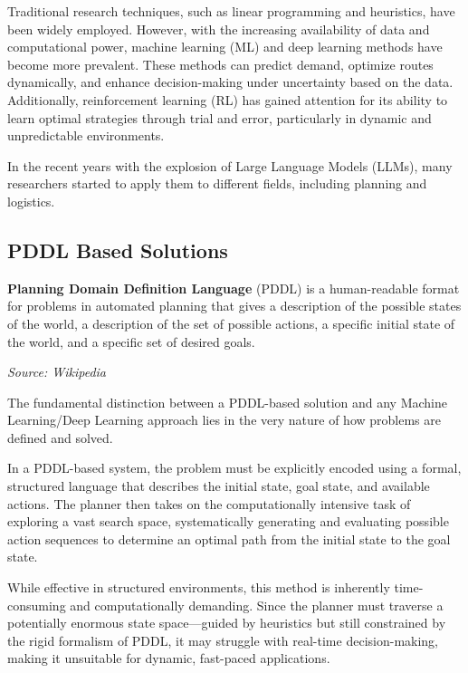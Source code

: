 Traditional research techniques, such as linear programming and heuristics, have
been widely employed. However, with the increasing availability of data and
computational power, machine learning (ML) and deep learning methods have become
more prevalent. These methods can predict demand, optimize routes dynamically,
and enhance decision-making under uncertainty based on the data. Additionally,
reinforcement learning (RL) has gained attention for its ability to learn
optimal strategies through trial and error, particularly in dynamic and unpredictable
environments.

In the recent years with the explosion of Large Language Models (LLMs), many
researchers started to apply them to different fields, including planning and logistics.


\subsection{PDDL Based Solutions}
\begin{blockquote}
  \textbf{Planning Domain Definition Language} (PDDL) is a human-readable format
  for problems in automated planning that gives a description of the possible
  states of the world, a description of the set of possible actions, a specific
  initial state of the world, and a specific set of desired goals.

  \emph{Source: Wikipedia\footnotemark}
\end{blockquote}

The fundamental distinction between a PDDL-based solution and any Machine Learning/Deep
Learning approach lies in the very nature of how problems are defined and solved.

In a PDDL-based system, the problem must be explicitly encoded using a formal, structured
language that describes the initial state, goal state, and available actions.
The planner then takes on the computationally intensive task of exploring a vast
search space, systematically generating and evaluating possible action sequences
to determine an optimal path from the initial state to the goal state.

While effective in structured environments, this method is inherently time-consuming
and computationally demanding. Since the planner must traverse a potentially enormous
state space—guided by heuristics but still constrained by the rigid formalism of
PDDL, it may struggle with real-time decision-making, making it unsuitable for dynamic,
fast-paced applications.

